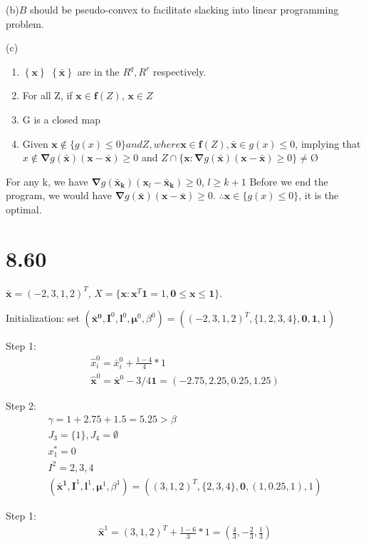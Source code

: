 \documentclass[12pt]{article}
\begin{document}
(b)$B$ should be pseudo-convex to facilitate slacking into linear programming 
problem.

(c)
\begin{enumerate}
    \item 
$\left\{\bm x \right\}$ $\left\{\bm{\bar x } \right\}$ are in the $R^q, R^r$ respectively.
\item 
    For all Z, if $\bm x\in \bm f(Z)$, $\bm x\in Z$
\item 
    G is a closed map
\item 
    Given $\bm x \not\in \{g(x)\le0\} and Z, where \bm x \in 
\bm f(Z),
\bm{\bar x } \in {g(x)\le0} $, implying that 
$x\not\in\bm\nabla g(\bm{\bar x})(\bm x-\bm{\bar x})\ge0$
and 
$Z\cap\{\bm x:\bm\nabla g(\bm{\bar x})(\bm x-\bm{\bar x})\ge0\}\neq $\O
\end{enumerate}
For any k, we have
$\bm\nabla g(\bm{\bar x_k})(\bm x_l-\bm{\bar x_k})\ge0$, $l\ge k+1$
Before we end the program, we would have
$\bm\nabla g(\bm{\bar x})(\bm x-\bm{\bar x})\ge0$.
$\therefore\bm x \in \{g(x)\le0\}$, it is the optimal.

\section*{8.60}
$\bm{\bar x}=(-2,3,1,2)^T$,
$X=\{\bm x:\bm x^T\bm 1=1, \bm0\le\bm x\le\bm 1\}$.

Initialization: set $( \bm{\bar x^0},\bm I^0, \bm l^0, \bm \mu^0, \beta^0 )
= ( (-2,3,1,2)^T,\{1,2,3,4\}, \bm 0, \bm 1, 1 )$

Step 1:
\begin{align*}
\hat{x}_i^0 = \bar x_i^0+\frac{1-4}{4}*1
\\
\hat{\bm x}^0= \bm{\bar x}^0-3/4\bm1=(-2.75,2.25,0.25,1.25 )
\end{align*}

Step 2:
\begin{align*}
 \gamma=1+2.75+1.5=5.25>\beta \\
 J_3=\{1\}, J_4=\emptyset \\
x^*_1=0\\
I^{2}={2,3,4}\\
( \bm{\bar x^1},\bm I^1, \bm l^1, \bm \mu^1, \beta^1 )
= ( (3,1,2)^T,\{2,3,4\}, \bm 0, (1,0.25,1), 1 )
\end{align*}

Step 1:
\begin{align*}
\hat{\bm x}^1= (3,1,2)^T+\frac{1-6}{3}*1
=(\frac{4}{3},-\frac{2}{3},\frac{1}{3})
\end{align*}
\end{document}
